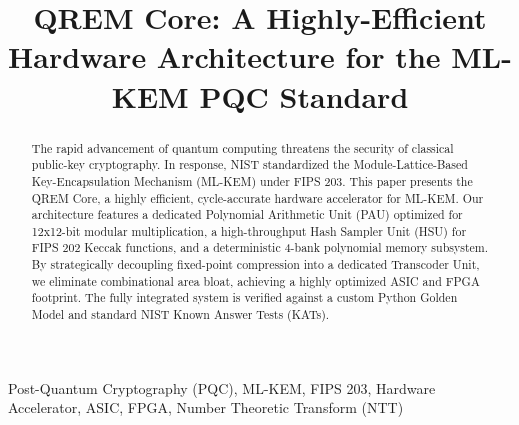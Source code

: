 \documentclass[conference]{IEEEtran}
\begin{document}
\title{QREM Core: A Highly-Efficient Hardware Architecture for the ML-KEM PQC Standard\\
}

\author{
\and
{}
\and
{}
}

\maketitle

\begin{abstract}
The rapid advancement of quantum computing threatens the security of classical public-key cryptography. In response, NIST standardized the Module-Lattice-Based Key-Encapsulation Mechanism (ML-KEM) under FIPS 203. This paper presents the QREM Core, a highly efficient, cycle-accurate hardware accelerator for ML-KEM. Our architecture features a dedicated Polynomial Arithmetic Unit (PAU) optimized for 12x12-bit modular multiplication, a high-throughput Hash Sampler Unit (HSU) for FIPS 202 Keccak functions, and a deterministic 4-bank polynomial memory subsystem. By strategically decoupling fixed-point compression into a dedicated Transcoder Unit, we eliminate combinational area bloat, achieving a highly optimized ASIC and FPGA footprint. The fully integrated system is verified against a custom Python Golden Model and standard NIST Known Answer Tests (KATs).
\end{abstract}

\begin{IEEEkeywords}
Post-Quantum Cryptography (PQC), ML-KEM, FIPS 203, Hardware Accelerator, ASIC, FPGA, Number Theoretic Transform (NTT)
\end{IEEEkeywords}
\end{document}
